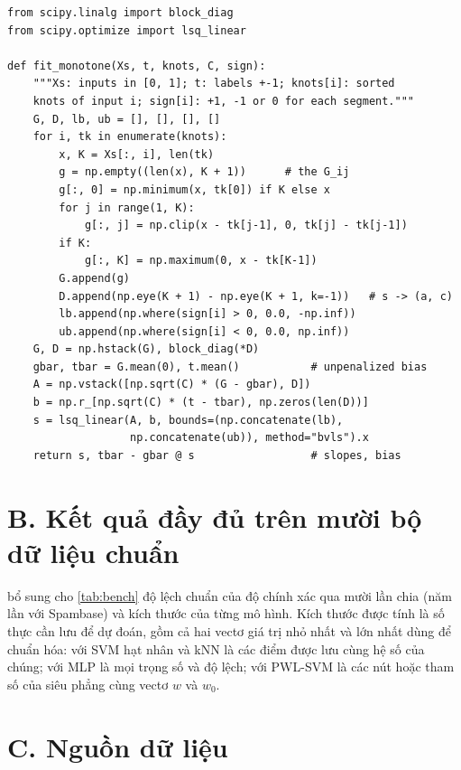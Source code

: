 \begin{lstlisting}
from scipy.linalg import block_diag
from scipy.optimize import lsq_linear

def fit_monotone(Xs, t, knots, C, sign):
    """Xs: inputs in [0, 1]; t: labels +-1; knots[i]: sorted
    knots of input i; sign[i]: +1, -1 or 0 for each segment."""
    G, D, lb, ub = [], [], [], []
    for i, tk in enumerate(knots):
        x, K = Xs[:, i], len(tk)
        g = np.empty((len(x), K + 1))      # the G_ij
        g[:, 0] = np.minimum(x, tk[0]) if K else x
        for j in range(1, K):
            g[:, j] = np.clip(x - tk[j-1], 0, tk[j] - tk[j-1])
        if K:
            g[:, K] = np.maximum(0, x - tk[K-1])
        G.append(g)
        D.append(np.eye(K + 1) - np.eye(K + 1, k=-1))   # s -> (a, c)
        lb.append(np.where(sign[i] > 0, 0.0, -np.inf))
        ub.append(np.where(sign[i] < 0, 0.0, np.inf))
    G, D = np.hstack(G), block_diag(*D)
    gbar, tbar = G.mean(0), t.mean()           # unpenalized bias
    A = np.vstack([np.sqrt(C) * (G - gbar), D])
    b = np.r_[np.sqrt(C) * (t - tbar), np.zeros(len(D))]
    s = lsq_linear(A, b, bounds=(np.concatenate(lb),
                   np.concatenate(ub)), method="bvls").x
    return s, tbar - gbar @ s                  # slopes, bias
\end{lstlisting}

\section*{B. Kết quả đầy đủ trên mười bộ dữ liệu chuẩn}

 bổ sung cho \cref{tab:bench} độ lệch chuẩn của độ chính xác qua mười lần chia (năm lần với Spambase) và kích thước của từng mô hình. Kích thước được tính là số thực cần lưu để dự đoán, gồm cả hai vectơ giá trị nhỏ nhất và lớn nhất dùng để chuẩn hóa: với SVM hạt nhân và kNN là các điểm được lưu cùng hệ số của chúng; với MLP là mọi trọng số và độ lệch; với PWL-SVM là các nút hoặc tham số của siêu phẳng cùng vectơ $w$ và $w_0$.



\section*{C. Nguồn dữ liệu}

